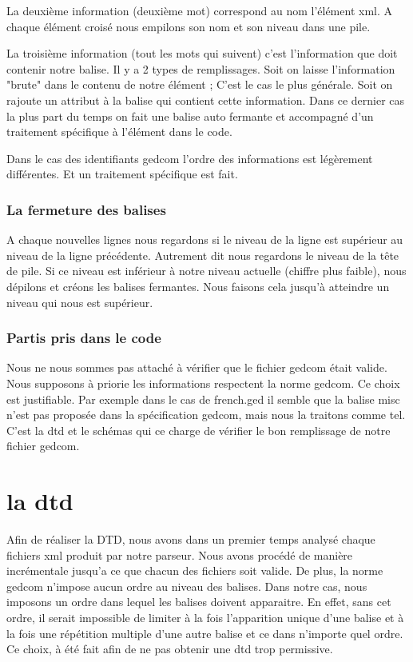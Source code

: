 \documentclass[12pt,a4paper]{report}
\begin{document}
La deuxième information (deuxième mot) correspond au nom l'élément xml.
A chaque élément croisé nous empilons son nom et son niveau dans une pile.

La troisième information (tout les mots qui suivent) c'est l'information 
que doit contenir notre balise. Il y a 2 types de remplissages. Soit on laisse
l'information "brute" dans le contenu de notre élément ; C'est le cas le plus
générale. Soit on rajoute un attribut à la balise qui contient cette
information. Dans ce dernier cas la plus part du temps on fait une balise auto
fermante et accompagné d'un traitement spécifique à l'élément dans le code.

Dans le cas des identifiants gedcom l'ordre des informations est légèrement
différentes. Et un traitement spécifique est fait.

\subsection{La fermeture des balises}

A chaque nouvelles lignes nous regardons si le niveau de la ligne est supérieur 
au niveau de la ligne précédente. Autrement dit nous regardons le niveau de la
tête de pile. Si ce niveau est inférieur à notre niveau actuelle (chiffre plus
faible), nous dépilons et créons les balises fermantes. Nous faisons cela 
jusqu'à atteindre un niveau qui nous est supérieur.

\subsection{Partis pris dans le code}

Nous ne nous sommes pas attaché à vérifier que le fichier gedcom était valide.
Nous supposons à priorie les informations respectent la norme gedcom. Ce 
choix est justifiable.
Par exemple dans le cas de french.ged il semble que la balise misc n'est pas 
proposée dans la spécification gedcom, mais nous la traitons comme tel.
C'est la dtd et le schémas qui ce charge de vérifier le bon remplissage de
notre fichier gedcom.



\chapter{la dtd}

Afin de réaliser la DTD, nous avons dans un premier temps analysé chaque fichiers
xml produit par notre parseur. Nous avons procédé de manière incrémentale jusqu'a
ce que chacun des fichiers soit valide.
De plus, la norme gedcom n'impose aucun ordre au niveau des balises. Dans notre
cas, nous imposons un ordre dans lequel les balises doivent apparaitre. En effet,
sans cet ordre, il serait impossible de limiter à la fois l'apparition unique d'une
balise et à la fois une répétition multiple d'une autre balise et ce dans n'importe
quel ordre. Ce choix, à été fait afin de ne pas obtenir une dtd trop permissive.
\end{document}
